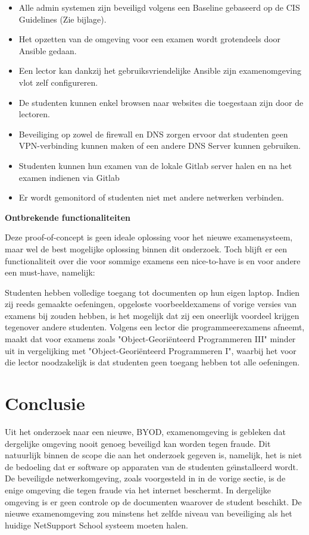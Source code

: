 \documentclass[a0,portrait]{a0poster}
\begin{document}
\begin{multicols}{2}
\begin{itemize}
	\item Alle admin systemen zijn beveiligd volgens een Baseline gebaseerd op de CIS Guidelines (Zie bijlage).
	\item Het opzetten van de omgeving voor een examen wordt grotendeels door Ansible gedaan.
	\item Een lector kan dankzij het gebruiksvriendelijke Ansible zijn examenomgeving vlot zelf configureren.
	\item De studenten kunnen enkel browsen naar websites die toegestaan zijn door de lectoren.
	\item Beveiliging op zowel de firewall en DNS zorgen ervoor dat studenten geen VPN-verbinding kunnen maken of een andere DNS Server kunnen gebruiken.
	\item Studenten kunnen hun examen van de lokale Gitlab server halen en na het examen indienen via Gitlab
	\item Er wordt gemonitord of studenten niet met andere netwerken verbinden.
\end{itemize}
\bigskip

\textbf{Ontbrekende functionaliteiten}

Deze proof-of-concept is geen ideale oplossing voor het nieuwe examensysteem, maar wel de best mogelijke oplossing binnen dit onderzoek.
Toch blijft er een functionaliteit over die voor sommige examens een nice-to-have is en voor andere een must-have, namelijk: 

Studenten hebben volledige toegang tot documenten op hun eigen laptop. Indien zij reeds gemaakte oefeningen, opgeloste voorbeeldexamens of vorige versies van examens bij zouden hebben, is het mogelijk dat zij een oneerlijk voordeel krijgen tegenover andere studenten. Volgens een lector die programmeerexamens afneemt, maakt dat voor examens zoals "Object-Geori\"{e}nteerd Programmeren III" minder uit in vergelijking met "Object-Geori\"{e}nteerd Programmeren I", waarbij het voor die lector noodzakelijk is dat studenten geen toegang hebben tot alle oefeningen.







\color{HoGentAccent1} 
\section*{Conclusie}
\color{black}

Uit het onderzoek naar een nieuwe, BYOD, examenomgeving is gebleken dat dergelijke omgeving nooit genoeg beveiligd kan worden tegen fraude. Dit natuurlijk binnen de scope die aan het onderzoek gegeven is, namelijk, het is niet de bedoeling dat er software op apparaten van de studenten ge\"{\i}nstalleerd wordt. De beveiligde netwerkomgeving, zoals voorgesteld in in de vorige sectie, is de enige omgeving die tegen fraude via het internet beschermt. In dergelijke omgeving is er geen controle op de documenten waarover de student beschikt. De nieuwe examenomgeving zou minstens het zelfde niveau van beveiliging als het huidige NetSupport School systeem moeten halen.  




\end{multicols}
\end{document}

